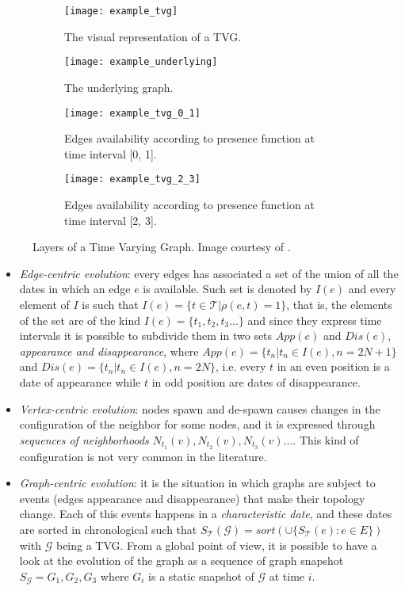 	\begin{figure}
		\begin{subfigure}{0.5\textwidth}
			\centering
			\texttt{[image: example\_tvg]}
			\caption{The visual representation of a TVG.}
		\end{subfigure}
		\begin{subfigure}{0.5\textwidth}
			\centering
			\texttt{[image: example\_underlying]}
			\caption{The underlying graph.}
		\end{subfigure}
		\begin{subfigure}{0.5\textwidth}
			\centering
			\texttt{[image: example\_tvg\_0\_1]}
			\caption{Edges availability according to presence function at time interval [0, 1].}
		\end{subfigure}
		\begin{subfigure}{0.5\textwidth}
			\centering
			\texttt{[image: example\_tvg\_2\_3]}
			\caption{Edges availability according to presence function at time interval [2, 3].}
		\end{subfigure}
		\caption{Layers of a Time Varying Graph. Image courtesy of \cite{Casteigts2012}.}
	\end{figure}
	
	\begin{itemize}
		\item \textit{Edge-centric evolution}: every edges has associated a set of the union of all the dates in which an edge \(e\) is available. Such set is denoted by \(I(e)\) and every element of \(I\) is such that \(I(e) = \{t \in \mathcal{T} | \rho(e,t) = 1\}\), that is, the elements of the set are of the kind \(I(e) = \{t_1, t_2, t_3 ... \}\) and since they express time intervals it is possible to subdivide them in two sets \(App(e)\) and \(Dis(e)\), \textit{appearance and disappearance}, where \(App(e) = \{t_n | t_n \in I(e), n = 2N + 1\}\) and \(Dis(e) = \{t_n | t_n \in I(e), n = 2N\}\), i.e. every \(t\) in an even position is a date of appearance while \(t\) in odd position are dates of disappearance.
		
		\item \textit{Vertex-centric evolution}: nodes spawn and de-spawn causes changes in the configuration of the neighbor for some nodes, and it is expressed through \textit{sequences of neighborhoods} \(N_{t_1}(v), N_{t_2}(v), N_{t_3}(v) ...\). This kind of configuration is not very common in the literature.
		
		\item \textit{Graph-centric evolution}: it is the situation in which graphs are subject to events (edges appearance and disappearance) that make their topology change. Each of this events happens in a \textit{characteristic date}, and these dates are sorted in chronological such that \(S_{\mathcal{T}}(\mathcal{G}) = sort(\cup\{S_{\mathcal{T}}(e) : e \in E\})\) with \( \mathcal{G}\) being a TVG. From a global point of view, it is possible to have a look at the evolution of the graph as a sequence of graph snapshot \(S_{\mathcal{G}} = G_1, G_2, G_3\) where \(G_i\) is a static snapshot of \(\mathcal{G}\) at time \(i\).
	\end{itemize}
	
